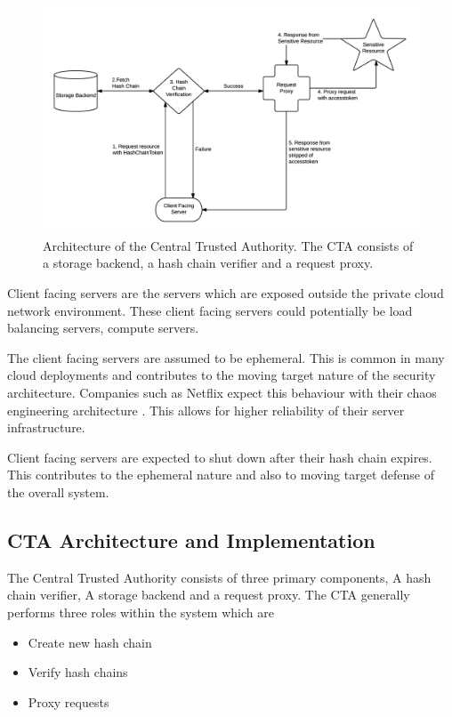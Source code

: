 \documentclass{sig-alternate-05-2015}
\begin{document}
\begin{figure}[!ht]
  \centering
  \includegraphics[keepaspectratio=true,scale=0.8]{cta_architecture}
  \caption{Architecture of the Central Trusted Authority. The CTA consists of a storage backend, a hash chain verifier and a request proxy.}
  \label{fig:ctaarchitecture}
\end{figure}


Client facing servers are the servers which are exposed outside the private cloud network environment. These client facing servers could potentially be load balancing servers, compute servers.

The client facing servers are assumed to be ephemeral. This is common in many cloud deployments \cite{vaquero_dynamically_2011} and contributes to the moving target nature of the security architecture. Companies such as Netflix expect this behaviour with their chaos engineering architecture \cite{basiri_chaos_2016}. This allows for higher reliability of their server infrastructure.

Client facing servers are expected to shut down after their hash chain expires. This contributes to the ephemeral nature and also to moving target defense of the overall system.

\subsection{CTA Architecture and Implementation}

The Central Trusted Authority consists of three primary components, A hash chain verifier, A storage backend and a request proxy. The CTA generally performs three roles within the system which are

\begin{itemize}
\item Create new hash chain
\item Verify hash chains
\item Proxy requests
\end{itemize}
\end{document}
